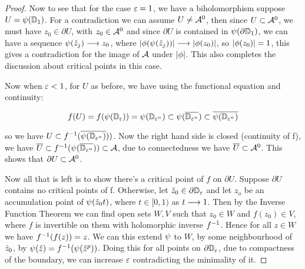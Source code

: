\documentclass[../main.tex]{subfiles}
\begin{document}
\begin{proof}
Now to see that for the case $\varepsilon = 1$, we have a biholomorphism suppose $U=\psi(\mathbb{D}_1)$. For a contradiction we can assume $U \neq \mathcal{A}^0$, then since $U\subset \mathcal{A}^0$, we must have $z_0 \in \partial U$, with $z_0 \in \mathcal{A}^0$ and since $\partial U$ is contained in $\psi(\partial \mathbb{D}_1)$, we can have a sequence $\psi(\hat{z}_j) \longrightarrow z_0$, where $\left|\phi(\psi(\hat{z}_j))\right| \longrightarrow \left|\phi(z_0)\right|$, so $\left|\phi(z_0)\right| = 1$, this gives a contradiction for the image of $\mathcal{A}$ under $\left|\phi\right|$. This also completes the discussion about critical points in this case.

Now when $\varepsilon <1$, for $U$ as before, we have using the functional equation and continuity:

$$f(U) = f(\psi(\mathbb{D}_{\varepsilon}))=\psi(\mathbb{D}_{\varepsilon^n}) \subset \psi(\overline{\mathbb{D}_{\varepsilon^n}}) \subset \overline{\psi(\mathbb{D}_{\varepsilon^n})}$$

so we have $U \subset f^{-1}(\overline{\psi(\mathbb{D}_{\varepsilon^n})}))$. Now the right hand side is closed (continuity of f), we have $\overline{U} \subset f^{-1}(\psi(\overline{\mathbb{D}_{\varepsilon^n}})) \subset \mathcal{A}$, due to connectedness we have $\overline{U} \subset \mathcal{A}^0$. This shows that $\partial U \subset \mathcal{A}^0$. 

Now all that is left is to show there's a critical point of $f$ on $\partial U$. Suppose $\partial U$ contains no critical points of f. Otherwise, let $\hat{z}_0 \in \partial \mathbb{D}_{\varepsilon}$ and let $z_o$ be an accumulation point of $\psi(\hat{z}_0t)$, where $t\in [0, 1)$ as $t \longrightarrow 1$. Then by the Inverse Function Theorem we can find open sets $W, V$ such that $z_0 \in W$ and $f(z_0)\in V$, where $f$ is invertible on them with holomorphic inverse $f^{-1}$. Hence for all $z \in W$ we have $f^{-1}(f(z))=z$. We can this extend $\psi$ to $W$, by some neighbourhood of $\hat{z}_0$, by $\psi(\hat{z}) = f^{-1}(\psi(\hat{z}^p))$. Doing this for all points on $\partial \mathbb{D}_{\varepsilon}$, due to compactness of the boundary, we can increase $\varepsilon$ contradicting the minimality of it. 

\end{proof}
\end{document}
